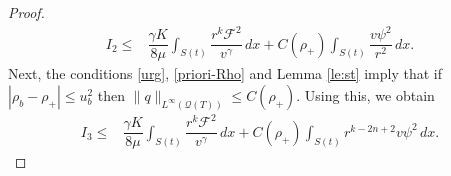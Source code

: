 \documentclass[a4paper,12pt,draft]{article}
\theoremstyle{remark}
\def\ut{\tilde{u}}
\def\rt{\tilde{\rho}}
\def\vt{\tilde{v}}
\def\mF{\mathcal{F}}
\def\mQ{\mathcal{Q}}
\begin{document}
\begin{proof}
        \begin{align*}
        I_2 %
        \le & \dfrac{\gamma K}{8 \mu} \int_{S(t)}\!\! \dfrac{r^{k}\mF^2}{v^{\gamma}}\, dx + C(\rho_{+}) \int_{S(t)}\!\! \dfrac{v\psi^2}{r^2} \, dx.
    \end{align*}
    Next, the conditions \eqref{urg}, \eqref{priori-Rho} and Lemma \ref{le:st} imply that if $|\rho_b-\rho_+|\le u_b^2$ then $\|q\|_{L^{\infty}(\mQ(T))} \le C(\rho_{+})$.
    Using this, we obtain
    \begin{align*}
        I_{3} %
        \le& \dfrac{\gamma K}{8\mu}\int_{S(t)}\!\!\dfrac{r^k \mF^2}{v^{\gamma}}\,dx + C(\rho_{+}) \int_{S(t)}\!\! r^{k-2n+2} v \psi^2\, dx.

\end{align*}
\end{proof}
\end{document}
